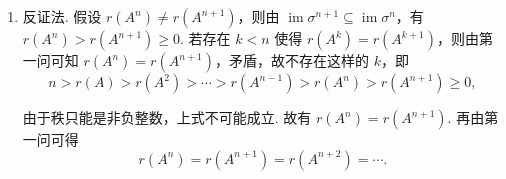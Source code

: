 \documentclass[UTF8,12pt,a4paper,fontset=fandol]{ctexart}
\begin{document}
\begin{solve}
\begin{enumerate}
                    因此，
                    \[
                        \operatorname{im} \sigma^m = \operatorname{im} \sigma^{m+1} = \operatorname{im} \sigma^{m+2} = \cdots.
                    \]

                    显然有
                    \[
                        r(A^m) = r(A^{m+1}) = r(A^{m+2}) = \cdots.
                    \]

                \item 反证法. 假设 $r(A^n) \neq r(A^{n+1})$，则由 $\operatorname{im} \sigma^{n+1} \subseteq \operatorname{im} \sigma^n$，有 $r(A^n) > r(A^{n+1}) \geqslant 0$.
                    若存在 $k < n$ 使得 $r(A^k) = r(A^{k+1})$，则由第一问可知 $r(A^n) = r(A^{n+1})$，矛盾，故不存在这样的 $k$，即
                    \[
                        n > r(A) > r(A^2) > \cdots > r(A^{n-1}) > r(A^n) > r(A^{n+1}) \geqslant 0,
                    \]

                    由于秩只能是非负整数，上式不可能成立. 故有 $r(A^n) = r(A^{n+1})$. 再由第一问可得
                    \[
                        r(A^n) = r(A^{n+1}) = r(A^{n+2}) = \cdots.
                    \]

            \end{enumerate}
\end{solve}
\end{document}
